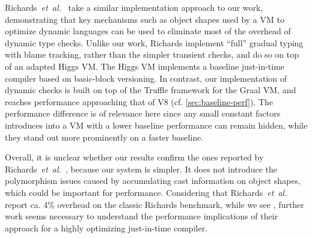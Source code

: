 Richards~\textit{et~al.}~\cite{Richards2017} take a similar implementation
approach to our work, demonstrating that key mechanisms such as object shapes
used by a VM to optimize dynamic languages can be used to eliminate most of
the overhead of dynamic type checks.
Unlike our work, Richards
implement ``full'' gradual typing with blame tracking, rather than
the simpler transient checks, and do so on top of an adapted Higgs
VM.
The Higgs VM implements a baseline just-in-time compiler based on
basic-block versioning\citep{Chevalier-Boisvert:2016:ITS}.
In contrast, our implementation of dynamic checks
is built on top of the Truffle framework for the Graal VM, and reaches
performance approaching that of V8 (cf. \cref{sec:baseline-perf}).
The performance difference is of relevance here since any small constant factors
introduces into a VM with a lower baseline performance can remain hidden,
while they stand out more prominently on a faster baseline.

Overall, it is unclear whether our results confirm the ones
reported by Richards~\textit{et~al.}~\cite{Richards2017},
because our system is simpler.
It does not introduce the polymorphism
issues caused by accumulating cast information on object shapes,
which could be important for performance.
Considering that Richards~\textit{et~al.} report ca. 4\% overhead
on the classic Richards benchmark, while we see \OverheadRichardsP,
further work seems necessary to understand the performance implications of
their approach for a highly optimizing just-in-time compiler.

%



